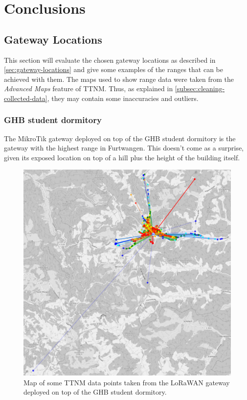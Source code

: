 \chapter{Conclusions}

\section{Gateway Locations}

This section will evaluate the chosen gateway locations as described in \cref{sec:gateway-locations} and give some examples of the ranges that can be achieved with them.
The maps used to show range data were taken from the \emph{Advanced Maps} feature of \ac{TTNM}.
Thus, as explained in \cref{subsec:cleaning-collected-data}, they may contain some inaccuracies and outliers.

\subsection{\acf{GHB} student dormitory}\label{subsec:ghb-student-dormitory-range-results}

The MikroTik gateway deployed on top of the \ac{GHB} student dormitory is the gateway with the highest range in Furtwangen.
This doesn't come as a surprise, given its exposed location on top of a hill plus the height of the building itself.

\begin{figure}
    \centering
    \includegraphics[width=1\textwidth]{pictures/ttn-mapper/gateway-ranges/ghb_mikrotik_gw_range.png}
    \caption{Map of some \ac{TTNM} data points taken from the \ac{LoRaWAN} gateway deployed on top of the \ac{GHB} student dormitory.\label{pic:ghb_mikrotik_gw_range}}
\end{figure}

